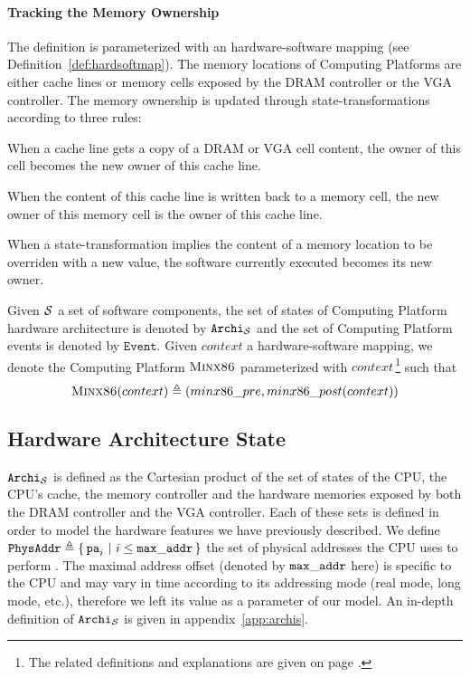 \paragraph{Tracking the Memory Ownership} The  definition is
parameterized with an hardware-software mapping (see
Definition~\ref{def:hardsoftmap}). The memory locations of 
Computing Platforms are either cache lines or memory cells exposed by the DRAM
controller or the VGA controller. The memory ownership is updated through
state-transformations according to three rules:
\begin{compactenum}
\item When a cache line gets a copy of a DRAM or VGA cell content, the owner of
  this cell becomes the new owner of this cache line.
\item When the content of this cache line is written back to a memory cell, the
  new owner of this memory cell is the owner of this cache line.
\item When a state-transformation implies the content of a memory location to be
  overriden with a new value, the software currently executed becomes its new
  owner.
\end{compactenum}

Given $\mathcal{S}$ a set of software components, the set of states of
 Computing Platform hardware architecture is denoted by
$\texttt{Archi}_{\mathcal{S}}$ and the set of  Computing Platform
events is denoted by $\texttt{Event}$. Given $context$ a hardware-software
mapping, we denote the Computing Platform $\textsc{Minx86}$ parameterized
with $context$\,\footnote{The related definitions and explanations are given on
  page \pageref{page:minx86def}.} such that
\[ \textsc{Minx86}(context) \triangleq (minx86\_pre,
  minx86\_post(context)) \]

\subsection{Hardware Architecture State}

$\texttt{Archi}_{\mathcal{S}}$ is defined as the Cartesian product of the set of
states of the CPU, the CPU's cache, the memory controller and the hardware
memories exposed by both the DRAM controller and the VGA controller. Each of
these sets is defined in order to model the hardware features we have previously
described. We define
$\texttt{PhysAddr} \triangleq \{\,\mathtt{pa}_i\ |\ i \leq \mathtt{max\_addr}\,\}$ the
set of physical addresses the CPU uses to perform \IO. The maximal address
offset (denoted by $\mathtt{max\_addr}$ here) is specific to the CPU and may vary
in time according to its addressing mode (real mode, long mode, etc.), therefore
we left its value as a parameter of our model.  An in-depth definition of
$\texttt{Archi}_{\mathcal{S}}$ is given in appendix~\ref{app:archis}.

